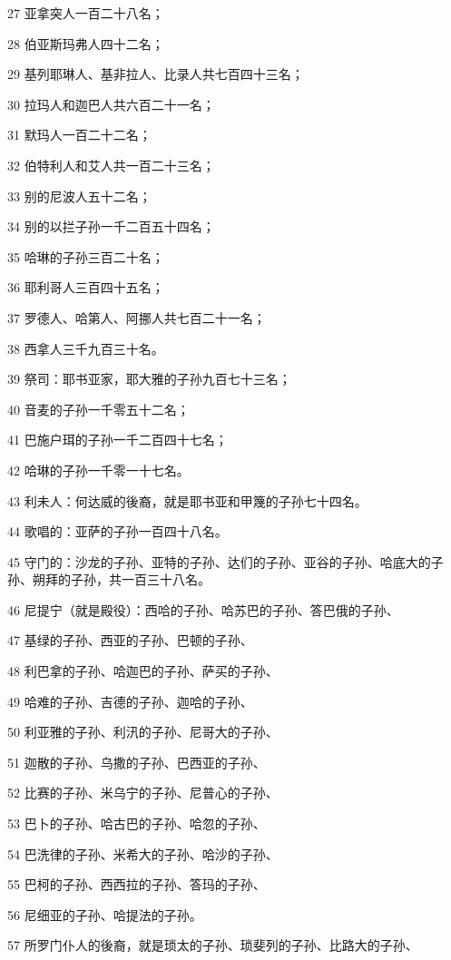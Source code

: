 \par 27 亚拿突人一百二十八名；
\par 28 伯亚斯玛弗人四十二名；
\par 29 基列耶琳人、基非拉人、比录人共七百四十三名；
\par 30 拉玛人和迦巴人共六百二十一名；
\par 31 默玛人一百二十二名；
\par 32 伯特利人和艾人共一百二十三名；
\par 33 别的尼波人五十二名；
\par 34 别的以拦子孙一千二百五十四名；
\par 35 哈琳的子孙三百二十名；
\par 36 耶利哥人三百四十五名；
\par 37 罗德人、哈第人、阿挪人共七百二十一名；
\par 38 西拿人三千九百三十名。
\par 39 祭司：耶书亚家，耶大雅的子孙九百七十三名；
\par 40 音麦的子孙一千零五十二名；
\par 41 巴施户珥的子孙一千二百四十七名；
\par 42 哈琳的子孙一千零一十七名。
\par 43 利未人：何达威的後裔，就是耶书亚和甲篾的子孙七十四名。
\par 44 歌唱的：亚萨的子孙一百四十八名。
\par 45 守门的：沙龙的子孙、亚特的子孙、达们的子孙、亚谷的子孙、哈底大的子孙、朔拜的子孙，共一百三十八名。
\par 46 尼提宁（就是殿役）：西哈的子孙、哈苏巴的子孙、答巴俄的子孙、
\par 47 基绿的子孙、西亚的子孙、巴顿的子孙、
\par 48 利巴拿的子孙、哈迦巴的子孙、萨买的子孙、
\par 49 哈难的子孙、吉德的子孙、迦哈的子孙、
\par 50 利亚雅的子孙、利汛的子孙、尼哥大的子孙、
\par 51 迦散的子孙、乌撒的子孙、巴西亚的子孙、
\par 52 比赛的子孙、米乌宁的子孙、尼普心的子孙、
\par 53 巴卜的子孙、哈古巴的子孙、哈忽的子孙、
\par 54 巴洗律的子孙、米希大的子孙、哈沙的子孙、
\par 55 巴柯的子孙、西西拉的子孙、答玛的子孙、
\par 56 尼细亚的子孙、哈提法的子孙。
\par 57 所罗门仆人的後裔，就是琐太的子孙、琐斐列的子孙、比路大的子孙、
